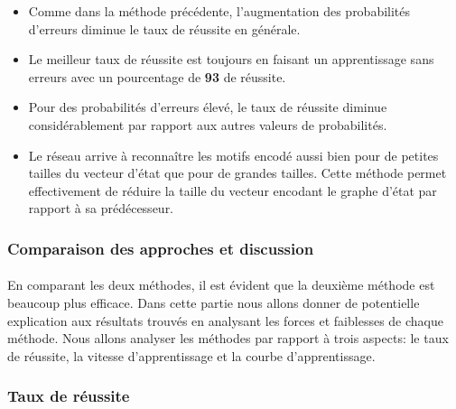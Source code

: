 \begin{itemize}
	\item Comme dans la méthode précédente, l'augmentation des probabilités d'erreurs diminue le taux de réussite en générale.
	\item Le meilleur taux de réussite est toujours en faisant un apprentissage sans erreurs avec un pourcentage de \textbf{93} de réussite.
	\item Pour des probabilités d'erreurs élevé, le taux de réussite diminue considérablement par rapport aux autres valeurs de probabilités.
	\item Le réseau arrive à reconnaître les motifs encodé aussi bien pour de petites tailles du vecteur d'état que pour de grandes tailles. Cette méthode permet effectivement de réduire la taille du vecteur encodant le graphe d'état par rapport à sa prédécesseur.	
\end{itemize}

\subsubsection{Comparaison des approches et discussion}
\paragraph{}En comparant les deux méthodes, il est évident que la deuxième méthode est beaucoup plus efficace. Dans cette partie nous allons donner de potentielle explication aux résultats trouvés en analysant les forces et faiblesses de chaque méthode. Nous allons analyser les méthodes par rapport à trois aspects: le taux de réussite, la vitesse d'apprentissage et la courbe d'apprentissage.
\subsubsection{Taux de réussite}\label{success_rate}
